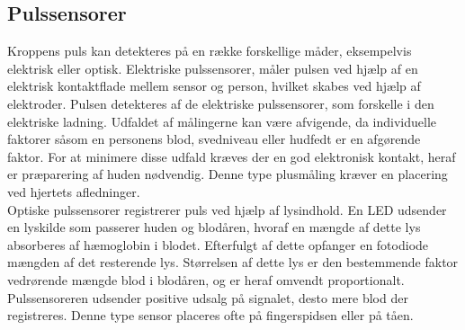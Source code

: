 \subsection{Pulssensorer}
Kroppens puls kan detekteres på en række forskellige måder, eksempelvis elektrisk eller optisk.
Elektriske pulssensorer, måler pulsen ved hjælp af en elektrisk kontaktflade mellem sensor og person, hvilket skabes ved hjælp af elektroder. Pulsen detekteres af de elektriske pulssensorer, som forskelle i den elektriske ladning. Udfaldet af målingerne kan være afvigende, da individuelle faktorer såsom en personens blod, svedniveau eller hudfedt er en afgørende faktor. For at minimere disse udfald kræves der en god elektronisk kontakt, heraf er præparering af huden nødvendig. Denne type plusmåling kræver en placering ved hjertets afledninger. \citep{PhuaLissorguesMercier2009}  \\
Optiske pulssensorer registrerer puls ved hjælp af lysindhold. En LED udsender en lyskilde som passerer huden og blodåren, hvoraf en mængde af dette lys absorberes af hæmoglobin i blodet. Efterfulgt af dette opfanger en fotodiode mængden af det resterende lys. Størrelsen af dette lys er den bestemmende faktor vedrørende mængde blod i blodåren, og er heraf omvendt proportionalt. Pulssensoreren udsender positive udsalg på signalet, desto mere blod der registreres. Denne type sensor placeres ofte på fingerspidsen eller på tåen.\citep{PhuaLissorguesMercier2009,SrinivasReddySrinivas2006} 

%
	


